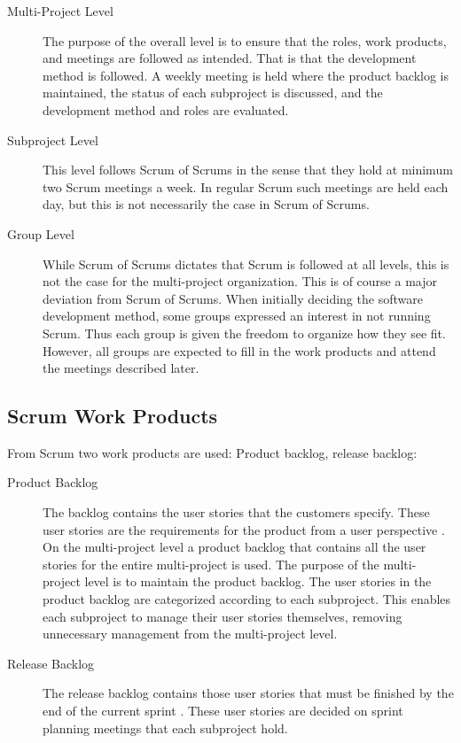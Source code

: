 \begin{description}
  \item[Multi-Project Level] The purpose of the overall level is to ensure that the roles, work products, and meetings are followed as intended. That is that the development method is followed. A weekly meeting is held where the product backlog is maintained, the status of each subproject is discussed, and the development method and roles are evaluated.
  \item[Subproject Level] This level follows Scrum of Scrums in the sense that they hold at minimum two Scrum meetings a week. In regular Scrum such meetings are held each day, but this is not necessarily the case in Scrum of Scrums.
  \item[Group Level] While Scrum of Scrums dictates that Scrum is followed at all levels, this is not the case for the multi-project organization. This is of course a major deviation from Scrum of Scrums. When initially deciding the software development method, some groups expressed an interest in not running Scrum. Thus each group is given the freedom to organize how they see fit. However, all groups are expected to fill in the work products and attend the meetings described later.
\end{description}

\subsection{Scrum Work Products}
From Scrum two work products are used: Product backlog, release backlog:

\begin{description}
  \item[Product Backlog] The backlog contains the user stories that the customers specify. These user stories are the requirements for the product from a user perspective \parencite{larman2003}. On the multi-project level a product backlog that contains all the user stories for the entire multi-project is used. The purpose of the multi-project level is to maintain the product backlog. The user stories in the product backlog are categorized according to each subproject. This enables each subproject to manage their user stories themselves, removing unnecessary management from the multi-project level.
  \item[Release Backlog] The release backlog contains those user stories that must be finished by the end of the current sprint \parencite{larman2003}. These user stories are decided on sprint planning meetings that each subproject hold.
\end{description}

